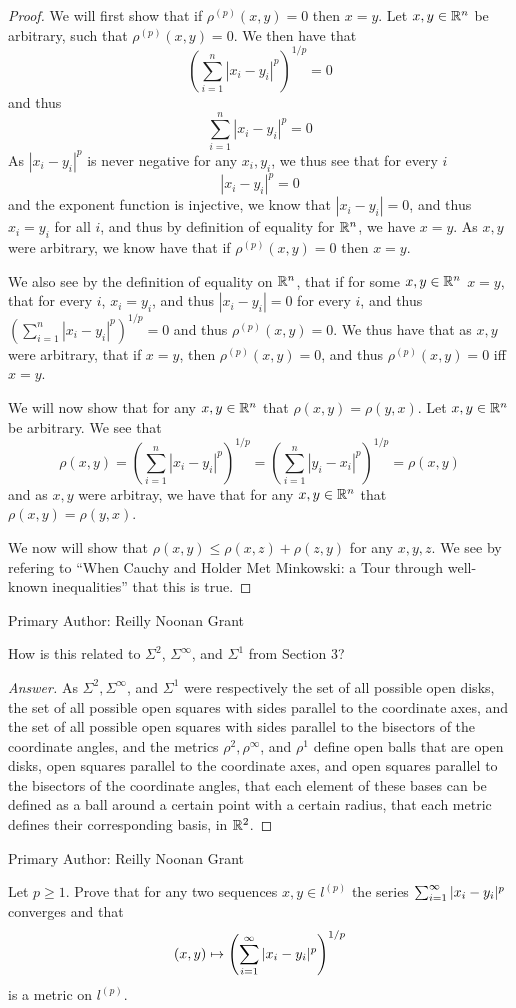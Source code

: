 \begin{proof}
  We will first show that if $\rho^{(p)}(x,y)=0$ then $x=y$. Let $x,y
  \in \mathbb{R}^n$ be arbitrary, such that $\rho^{(p)}(x,y)=0$. We then have that 
  $$(\sum_{i=1}^n |x_i - y_i|^p)^{1/p} =0$$
  and thus
  $$\sum_{i=1}^n |x_i - y_i|^p =0$$
  As $|x_i - y_i|^p$ is never negative for any $x_i,y_i$, we thus see
  that for every $i$
  $$|x_i - y_i|^p =0$$ and the exponent function is injective, we know
  that $|x_i - y_i|=0$, and thus $x_i=y_i$ for all $i$, and thus by
  definition of equality for $\mathbb{R}^n$, we have $x=y$. As $x,y$ were
  arbitrary, we know have that  if $\rho^{(p)}(x,y)=0$ then $x=y$.

  We also see by the definition of equality on $\mathbb{R}^n$, that if for
  some $x,y\in \mathbb{R}^n$ $x=y$, that for
  every $i$, $x_i=y_i$, and thus $|x_i-y_i|=0$ for every $i$, and thus
  $(\sum_{i=1}^n |x_i - y_i|^p)^{1/p}=0$  and thus
  $\rho^{(p)}(x,y)=0$. We thus have that as $x,y$ were arbitrary, that
  if $x=y$, then $\rho^{(p)}(x,y)=0$, and thus $\rho^{(p)}(x,y)=0$ iff
  $x=y$.

  We will now show that for any $x,y\in \mathbb{R}^n$ that
  $\rho(x,y)=\rho(y,x)$. Let $x,y\in \mathbb{R}^n$ be arbitrary.
  We see that 
  $$\rho(x,y) = 
  (\sum_{i=1}^n |x_i - y_i|^p)^{1/p}= 
  (\sum_{i=1}^n |y_i - x_i|^p)^{1/p}= 
  \rho(x,y)$$
  and as $x,y$ were arbitray, we have that 
   for any $x,y\in \mathbb{R}^n$ that
  $\rho(x,y)=\rho(y,x)$.

  We now will show that $\rho(x,y) \leq \rho(x,z) + \rho(z,y)$ for any
  $x,y,z$. We see by refering to ``When Cauchy and Holder Met
  Minkowski: a Tour through well-known inequalities'' that this is true.
\end{proof}
Primary Author: Reilly Noonan Grant

\begin{minorEx}%
    [Riddle]
    How is this related to $\Sigma^2$, $\Sigma^{\infty}$, and $\Sigma^1$ from
    Section 3?
\end{minorEx}

\begin{proof}[Answer]
  As $\Sigma^2,\Sigma^\infty$, and $\Sigma^1$ were respectively the
  set of all possible open disks,  the set of all possible open
  squares with sides parallel to the coordinate axes,
  and the set of all possible open squares with sides
  parallel to the bisectors of the coordinate angles, and the metrics 
  $\rho^2,\rho^\infty$, and $\rho^1$ define open balls that are
 open disks, open squares parallel to the coordinate axes, and open
 squares parallel to the bisectors of the coordinate angles, that each
 element of these bases can be defined as a ball around a certain
 point with a certain radius, that each metric defines their
 corresponding basis, in $\mathbb{R}^2$.
\end{proof}

Primary Author: Reilly Noonan Grant

\begin{minorEx}%
    Let $p \geq 1$. Prove that for any two sequences $x, y \in l^{(p)}$ the
    series $\sum_{i=1}^{\infty} |x_i - y_i|^p$ converges and that
    \[
        (x, y) \mapsto \left( \sum_{i=1}^{\infty} |x_i - y_i|^p
        \right)^{1/p}
    \]
    is a metric on $l^{(p)}$.
\end{minorEx}
